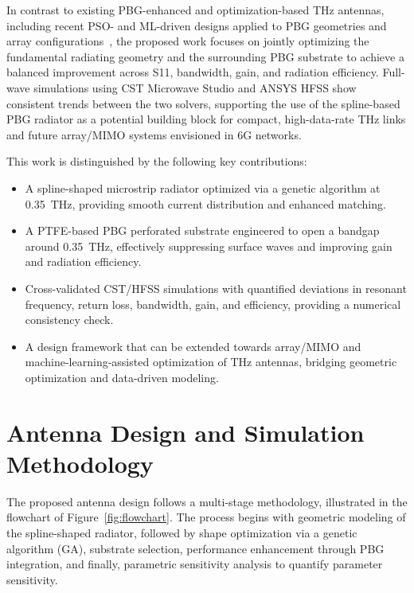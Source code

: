 \documentclass[draft]{agujournal2019}
\begin{document}
In contrast to existing PBG-enhanced and optimization-based THz antennas, including recent PSO- and ML-driven designs applied to PBG geometries and array configurations~\cite{babaahmed_hybrid_2025,li_triband_2024,panda_fractal_2025}, the proposed work focuses on jointly optimizing the fundamental radiating geometry and the surrounding PBG substrate to achieve a balanced improvement across S11, bandwidth, gain, and radiation efficiency. Full-wave simulations using CST Microwave Studio and ANSYS HFSS show consistent trends between the two solvers, supporting the use of the spline-based PBG radiator as a potential building block for compact, high-data-rate THz links and future array/MIMO systems envisioned in 6G networks.

This work is distinguished by the following key contributions:
\begin{itemize}
    \item A spline-shaped microstrip radiator optimized via a genetic algorithm at 0.35~THz, providing smooth current distribution and enhanced matching.
    \item A PTFE-based PBG perforated substrate engineered to open a bandgap around 0.35~THz, effectively suppressing surface waves and improving gain and radiation efficiency.
    \item Cross-validated CST/HFSS simulations with quantified deviations in resonant frequency, return loss, bandwidth, gain, and efficiency, providing a numerical consistency check.
    \item A design framework that can be extended towards array/MIMO and machine-learning-assisted optimization of THz antennas, bridging geometric optimization and data-driven modeling.
\end{itemize}

\section{Antenna Design and Simulation Methodology}
\label{sec:design}

The proposed antenna design follows a multi-stage methodology, illustrated in the flowchart of Figure~\ref{fig:flowchart}. The process begins with geometric modeling of the spline-shaped radiator, followed by shape optimization via a genetic algorithm (GA), substrate selection, performance enhancement through PBG integration, and finally, parametric sensitivity analysis to quantify parameter sensitivity.
\end{document}
